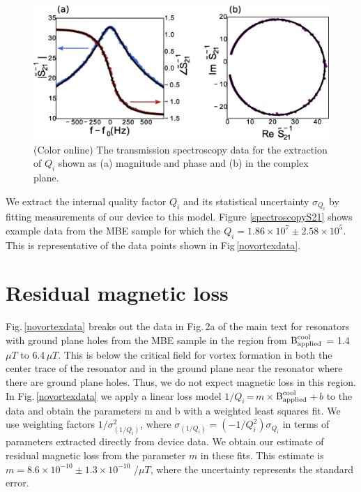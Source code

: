 \begin{figure}[b]
    \begin{center}
        \includegraphics[width=150mm]{DielectricFluxTrap_Supp_Rev2_basicfit.jpg}
        \caption{(Color online)  The transmission spectroscopy data for the extraction of $Q_{i}$ shown as (a) magnitude and phase and (b) in the complex plane.}
        \label{basicfit}
    \end{center}
\end{figure}

We extract the internal quality factor $Q_{i}$ and its statistical uncertainty $\sigma_{Q_{i}}$ by fitting measurements of our device to this model.  Figure \ref{spectroscopyS21} shows example data from the MBE sample for which the $Q_{i} = 1.86 \times 10^{7} \pm 2.58 \times 10^{5}$.  This is representative of the data points shown in Fig\,\ref{novortexdata}.

\section{Residual magnetic loss}
Fig.\,\ref{novortexdata} breaks out the data in Fig.\,2a of the main text for resonators with ground plane holes from the MBE sample in the region from $\text{B}^{\text{cool}}_{\text{applied}}$ = 1.4\,$\mu T$ to 6.4\,$\mu T$.  This is below the critical field for vortex formation in both the center trace of the resonator and in the ground plane near the resonator where there are ground plane holes.  Thus, we do not expect magnetic loss in this region.  In Fig.\,\ref{novortexdata} we apply a linear loss model $1/Q_{i}$\,=\,$m$\,$\times$\,$\text{B}^{\text{cool}}_{\text{applied}}$\,+\,$b$ to the data and obtain the parameters m and b with a weighted least squares fit.  We use weighting factors $1/\sigma^2_{\left( 1/Q_i \right)}$, where $\sigma_{\left( 1/Q_i \right)}=\left( -1/Q_{i}^{2} \right) \sigma_{Q_{i}}$ in terms of parameters extracted directly from device data.  We obtain our estimate of residual magnetic loss from the parameter $m$ in these fits.  This estimate is $m = 8.6\times10^{-10} \pm 1.3\times 10^{-10}$ /$\mu T$, where the uncertainty represents the standard error.


